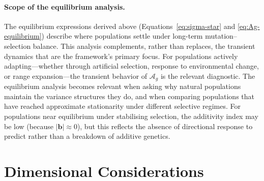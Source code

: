 \documentclass[9pt,twocolumn,twoside,lineno]{gsajnl}
\newcommand{\Ag}{\ensuremath{\mathcal{A}_{g}}\xspace}
\newcommand{\Vlin}{\ensuremath{V_{\text{lin}}}\xspace}
\newcommand{\Vquad}{\ensuremath{V_{\text{quad}}}\xspace}
\begin{document}
\begin{figure}[!htb]
\label{fig:trajectories}
\end{figure}


\paragraph{Scope of the equilibrium analysis.}
The equilibrium expressions derived above (Equations~\eqref{eq:sigma-star} and \eqref{eq:Ag-equilibrium}) describe where populations settle under long-term mutation--selection balance. This analysis complements, rather than replaces, the transient dynamics that are the framework's primary focus. For populations actively adapting---whether through artificial selection, response to environmental change, or range expansion---the transient behavior of $\mathcal{A}_g$ is the relevant diagnostic. The equilibrium analysis becomes relevant when asking why natural populations maintain the variance structures they do, and when comparing populations that have reached approximate stationarity under different selective regimes. For populations near equilibrium under stabilising selection, the additivity index may be low (because $|\bm{b}| \approx 0$), but this reflects the absence of directional response to predict rather than a breakdown of additive genetics.
\section{Dimensional Considerations}
\label{sec:dimension}
\end{document}
